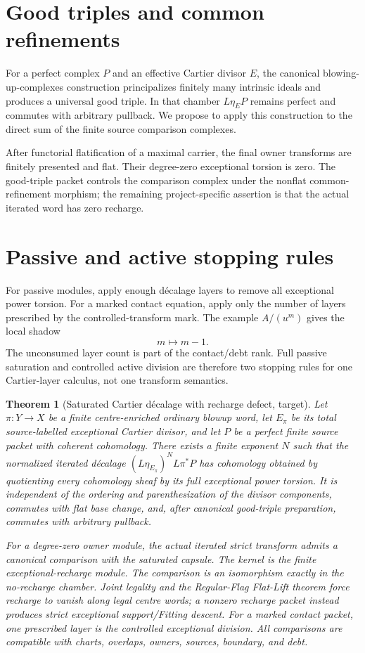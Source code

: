 \documentclass[11pt]{amsart}
\newtheorem{theorem}{Theorem}[section]
\begin{document}
\section{Good triples and common refinements}
For a perfect complex $P$ and an effective Cartier divisor $E$, the canonical
blowing-up-complexes construction principalizes finitely many intrinsic ideals
and produces a universal good triple.  In that chamber $L\eta_E P$ remains
perfect and commutes with arbitrary pullback.  We propose to apply this
construction to the direct sum of the finite source comparison complexes.

After functorial flatification of a maximal carrier, the final owner transforms
are finitely presented and flat.  Their degree-zero exceptional torsion is
zero.  The good-triple packet controls the comparison complex under the
nonflat common-refinement morphism; the remaining project-specific assertion is
that the actual iterated word has zero recharge.

\section{Passive and active stopping rules}
For passive modules, apply enough d\'ecalage layers to remove all exceptional
power torsion.  For a marked contact equation, apply only the number of layers
prescribed by the controlled-transform mark.  The example $A/(u^m)$ gives the
local shadow
\[
 m\longmapsto m-1.
\]
The unconsumed layer count is part of the contact/debt rank.  Full passive
saturation and controlled active division are therefore two stopping rules for
one Cartier-layer calculus, not one transform semantics.

\begin{theorem}[Saturated Cartier d\'ecalage with recharge defect, target]
Let $\pi:Y\to X$ be a finite centre-enriched ordinary blowup word, let
$E_\pi$ be its total source-labelled exceptional Cartier divisor, and let $P$
be a perfect finite source packet with coherent cohomology.  There exists a
finite exponent $N$ such that the normalized iterated d\'ecalage
$(L\eta_{E_\pi})^NL\pi^*P$ has cohomology obtained by quotienting every
cohomology sheaf by its full exceptional power torsion.  It is independent of
the ordering and parenthesization of the divisor components, commutes with flat
base change, and, after canonical good-triple preparation, commutes with
arbitrary pullback.

For a degree-zero owner module, the actual iterated strict transform admits a
canonical comparison with the saturated capsule.  The kernel is the finite
exceptional-recharge module.  The comparison is an isomorphism exactly in the
no-recharge chamber.  Joint legality and the Regular-Flag Flat-Lift theorem
force recharge to vanish along legal centre words; a nonzero recharge packet
instead produces strict exceptional support/Fitting descent.  For a marked
contact packet, one prescribed layer is the controlled exceptional division.
All comparisons are compatible with charts, overlaps, owners, sources,
boundary, and debt.
\end{theorem}
\end{document}
